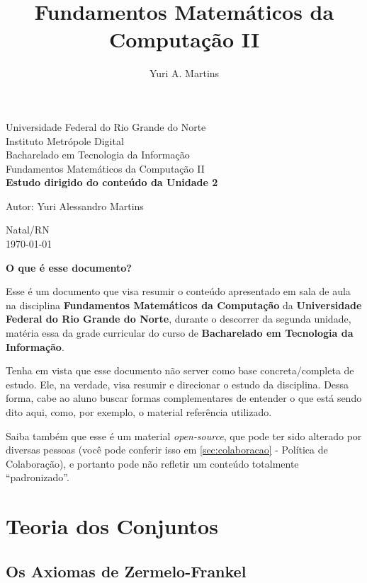 \documentclass[12pt, a4paper]{article}
\author{Yuri A. Martins}
\title{Fundamentos Matemáticos da Computação II}
\begin{document}
\begin{titlepage}
\begin{center}
{\large Universidade Federal do Rio Grande do Norte}\\[0.2cm]
{\large Instituto Metrópole Digital}\\[0.2cm]
{\large Bacharelado em Tecnologia da Informação}\\[0.2cm]
{\large Fundamentos Matemáticos da Computação II}\\[5.1cm]
{\bf \huge Estudo dirigido do conteúdo da Unidade 2}\\[5.1cm]
\end{center}
{\large Autor: Yuri Alessandro Martins}\\[0.7cm]
\begin{center}
{\large Natal/RN}\\[0.2cm]
{\large \today}
\end{center}
\end{titlepage}

\begin{center}
\large \textbf{O que é esse documento?}
\end{center}

Esse é um documento que visa resumir o conteúdo apresentado em sala de aula na disciplina \textbf{Fundamentos Matemáticos da Computação} da \textbf{Universidade Federal do Rio Grande do Norte}, durante o descorrer da segunda unidade, matéria essa da grade curricular do curso de \textbf{Bacharelado em Tecnologia da Informação}. 

Tenha em vista que esse documento não server como base concreta/completa de estudo. Ele, na verdade, visa resumir e direcionar o estudo da disciplina. Dessa forma, cabe ao aluno buscar formas complementares de entender o que está sendo dito aqui, como, por exemplo, o material referência utilizado.

Saiba também que esse é um material \textit{open-source}, que pode ter sido alterado por diversas pessoas (você pode conferir isso em \ref{sec:colaboracao} - Política de Colaboração), e portanto pode não refletir um conteúdo totalmente ``padronizado''.


\clearpage

\tableofcontents
\clearpage

\section{Teoria dos Conjuntos}

\subsection{Os Axiomas de Zermelo-Frankel}
\end{document}

